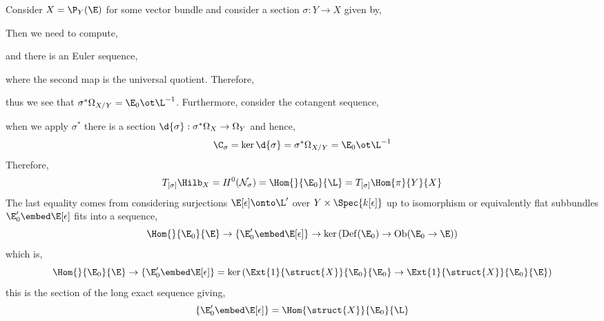 \documentclass[12pt]{article}
\begin{document}
\begin{example}
Consider $X = \P_Y(\E)$ for some vector bundle and consider a section $\sigma : Y \to X$ given by,
\begin{center}
\end{center}
Then we need to compute,
\begin{center}
\end{center}
and there is an Euler sequence,
\begin{center}
\end{center}
where the second map is the universal quotient. Therefore,
\begin{center}
\end{center}
thus we see that $\sigma^* \Omega_{X/Y} = \E_0 \ot \L^{-1}$. Furthermore, consider the cotangent sequence,
\begin{center}
\end{center}
when we apply $\sigma^*$ there is a section $\d{\sigma} : \sigma^* \Omega_X \to \Omega_Y$ and hence,
\[ \C_{\sigma} = \ker{\d{\sigma}} = \sigma^* \Omega_{X/Y} = \E_0 \ot \L^{-1} \]
Therefore, 
\[ T_{[\sigma]} \Hilb_X = H^0(\cN_{\sigma}) = \Hom{}{\E_0}{\L} = T_{[\sigma]} \Hom{\pi}{Y}{X} \]
The last equality comes from considering surjections $\E[\epsilon] \onto \L'$ over $Y \times \Spec{k[\epsilon]}$ up to isomorphism or equivalently flat subbundles $\E_0' \embed \E[\epsilon]$ fits into a sequence,
\[ \Hom{}{\E_0}{\E} \to \{ \E_0' \embed \E[\epsilon] \} \to \ker{(\mathrm{Def}(\E_0) \to \mathrm{Ob}(\E_0 \to \E))} \]
which is,
\[ \Hom{}{\E_0}{\E} \to \{ \E_0' \embed \E[\epsilon] \} = \ker{(\Ext{1}{\struct{X}}{\E_0}{\E_0} \to \Ext{1}{\struct{X}}{\E_0}{\E})} \]
this is the section of the long exact sequence giving,
\[ \{ \E_0' \embed \E[\epsilon] \} = \Hom{\struct{X}}{\E_0}{\L} \]
\end{example}
\end{document}
